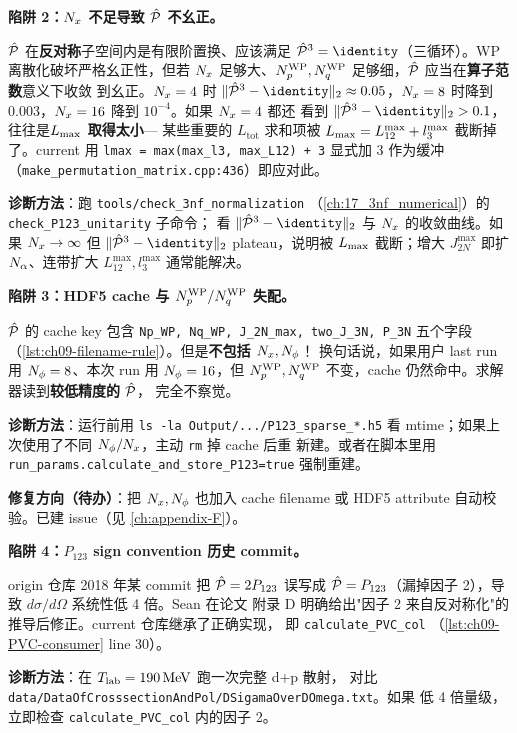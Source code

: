 \begin{pitfallbox}
\textbf{陷阱 2：\(N_{x}\) 不足导致 \(\hat{\mathcal{P}}\) 不幺正。}

\(\hat{\mathcal{P}}\) 在\textbf{反对称}子空间内是有限阶置换、应该满足
\(\Pop^3 = \identity\)（三循环）。WP 离散化破坏严格幺正性，但若 \(N_{x}\)
足够大、\({N_{p}^{\text{WP}}}, {N_{q}^{\text{WP}}}\) 足够细，\(\hat{\mathcal{P}}\) 应当在\textbf{算子范数}意义下收敛
到幺正。\(N_{x}=4\) 时 \(\|\Pop^3-\identity\|_2 \approx 0.05\)，\(N_{x}=8\)
时降到 \(0.003\)，\(N_{x}=16\) 降到 \(10^{-4}\)。如果 \(N_{x}=4\) 都还
看到 \(\|\Pop^3-\identity\|_2 > 0.1\)，往往是\textbf{\(L_{\max}\) 取得太小}—
某些重要的 \(L_{\text{tot}}\) 求和项被 \(L_{\max} = L_{12}^{\max}+l_3^{\max}\)
截断掉了。current 用 \texttt{lmax = max(max\_l3, max\_L12) + 3} 显式加 3
作为缓冲（\texttt{make\_permutation\_matrix.cpp:436}）即应对此。

\textbf{诊断方法}：跑 \texttt{tools/check\_3nf\_normalization}
（\cref{ch:17_3nf_numerical}）的 \texttt{check\_P123\_unitarity} 子命令；
看 \(\|\Pop^3-\identity\|_2\) 与 \(N_{x}\) 的收敛曲线。如果 \(N_{x}\to\infty\)
但 \(\|\Pop^3-\identity\|_2\) plateau，说明被 \(L_{\max}\) 截断；增大
\(J_{2N}^{\max}\) 即扩 \(N_\alpha\)、连带扩大 \(L_{12}^{\max}, l_3^{\max}\)
通常能解决。
\end{pitfallbox}

\begin{pitfallbox}
\textbf{陷阱 3：HDF5 cache 与 \({N_{p}^{\text{WP}}}/{N_{q}^{\text{WP}}}\) 失配。}

\(\hat{\mathcal{P}}\) 的 cache key 包含 \texttt{Np\_WP, Nq\_WP, J\_2N\_max, two\_J\_3N, P\_3N}
五个字段（\cref{lst:ch09-filename-rule}）。但是\textbf{不包括 \(N_{x}, N_{\phi}\)}！
换句话说，如果用户 last run 用 \(N_{\phi}=8\)、本次 run 用 \(N_{\phi}=16\)，但
\({N_{p}^{\text{WP}}}, {N_{q}^{\text{WP}}}\) 不变，cache 仍然命中。求解器读到\textbf{较低精度的} \(\hat{\mathcal{P}}\)，
完全不察觉。

\textbf{诊断方法}：运行前用 \texttt{ls -la Output/.../P123\_sparse\_*.h5} 看
mtime；如果上次使用了不同 \(N_{\phi}/N_{x}\)，主动 \texttt{rm} 掉 cache 后重
新建。或者在脚本里用 \texttt{run\_params.calculate\_and\_store\_P123=true}
强制重建。

\textbf{修复方向（待办）}：把 \(N_{x}, N_{\phi}\) 也加入 cache filename 或 HDF5
attribute 自动校验。已建 issue（见 \cref{ch:appendix-F}）。
\end{pitfallbox}

\begin{pitfallbox}
\textbf{陷阱 4：\(P_{123}\) sign convention 历史 commit。}

origin 仓库 2018 年某 commit 把
\(\hat{\mathcal{P}} = 2 P_{123}\) 误写成 \(\hat{\mathcal{P}} = P_{123}\)（漏掉因子 2），导致
\(d\sigma/d\Omega\) 系统性低 4 倍。Sean 在论文 \cite{MillerThesis} 附录 D
明确给出"因子 2 来自反对称化"的推导后修正。current 仓库继承了正确实现，
即 \texttt{calculate\_PVC\_col}
（\cref{lst:ch09-PVC-consumer} line 30）。

\textbf{诊断方法}：在 \({T_{\text{lab}}}=190\,\mathrm{MeV}\) 跑一次完整 d+p 散射，
对比 \texttt{data/DataOfCrosssectionAndPol/DSigamaOverDOmega.txt}。如果
低 4 倍量级，立即检查 \texttt{calculate\_PVC\_col} 内的因子 2。
\end{pitfallbox}

